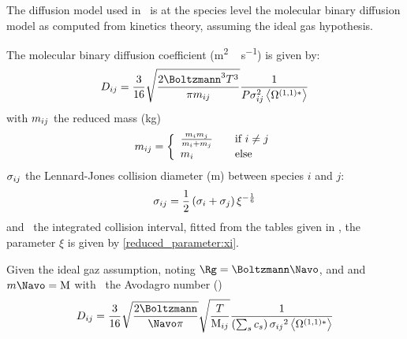 The diffusion model used in \Antioch\ is at the species
level the molecular binary diffusion model as computed from kinetics
theory, assuming the ideal gas hypothesis.

The molecular binary diffusion coefficient (\unit{m^2\,s^{-1}}) is given by:
\begin{equation}
\diff[ij] = \frac{3}{16} \sqrt{\frac{2\Boltzmann^3\Temp^3}{\pi\Mass_{ij}}}\frac{1}{\Press\LJdia_{ij}^2\Stockmayer{1}}
\label{bimol_diff:eq}
\end{equation}
with $\Mass_{ij}$ the reduced mass (\unit{kg})
\begin{equation}
\Mass_{ij} = \left\{\begin{array}{l@{\qquad}l}
                \frac{\Mass_i\Mass_j}{\Mass_i + \Mass_j} & \text{if } i \neq j \\
                \Mass_i                                  & \text{else}
                    \end{array}
              \right.
\label{diffusion:bimol:red_mass}
\end{equation}
$\LJdia_{ij}$ the Lennard-Jones collision diameter (\unit{m})
between species $i$ and $j$:
\begin{equation}
\LJdia_{ij} = \frac{1}{2}\left(\LJdia_i + \LJdia_j\right) \xi^{-\frac{1}{6}}
\label{diffusion:bimol:LJdia}
\end{equation}
and \ the integrated collision interval, fitted from
the tables given in \citet{Monchick1961}, the parameter $\xi$
is given by \ref{reduced_parameter:xi}.

Given the ideal gaz assumption, noting $\Rg = \Boltzmann\Navo$, and
and $\Mass\Navo = \Mm$ with
\Navo\ the Avodagro number (\NavoEquation)
\begin{equation}
\diff[ij] = \frac{3}{16}\sqrt{\frac{2\Boltzmann}{\Navo\pi}} 
                \sqrt{\frac{\Temp}{\Mm[ij]}}\frac{1}{\left(\sum_s\conc_s\right)\LJdia[ij]^2\Stockmayer{1}}
\label{diffusion:bimol:simplified}
\end{equation}
